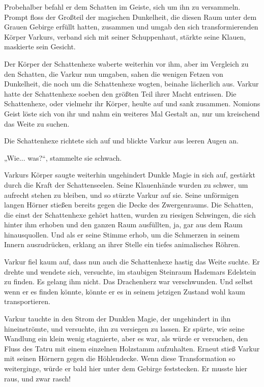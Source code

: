 Probehalber befahl er dem Schatten im Geiste, sich um ihn zu versammeln. Prompt floss der Großteil der magischen Dunkelheit, die diesen Raum unter dem Grauen Gebirge erfüllt hatten, zusammen und umgab den sich transformierenden Körper Varkurs, verband sich mit seiner Schuppenhaut, stärkte seine Klauen, maskierte sein Gesicht.

Der Körper der Schattenhexe waberte weiterhin vor ihm, aber im Vergleich zu den Schatten, die Varkur nun umgaben, sahen die wenigen Fetzen von Dunkelheit, die noch um die Schattenhexe wogten, beinahe lächerlich aus. Varkur hatte der Schattenhexe soeben den größten Teil ihrer Macht entrissen. Die Schattenhexe, oder vielmehr ihr Körper, heulte auf und sank zusammen. Nomions Geist löste sich von ihr und nahm ein weiteres Mal Gestalt an, nur um kreischend das Weite zu suchen.

Die Schattenhexe richtete sich auf und blickte Varkur aus leeren Augen an.

„Wie... was?“, stammelte sie schwach.

Varkurs Körper saugte weiterhin ungehindert Dunkle Magie in sich auf, gestärkt durch die Kraft der Schattenseelen. Seine Klauenhände wurden zu schwer, um aufrecht stehen zu bleiben, und so stürzte Varkur auf sie. Seine unförmigen langen Hörner stießen bereits gegen die Decke des Zwergenraums. Die Schatten, die einst der Schattenhexe gehört hatten, wurden zu riesigen Schwingen, die sich hinter ihm erhoben und den ganzen Raum ausfüllten, ja, gar aus dem Raum hinausquollen. Und als er seine Stimme erhob, um die Schmerzen in seinem Innern auszudrücken, erklang an ihrer Stelle ein tiefes animalisches Röhren.

Varkur fiel kaum auf, dass nun auch die Schattenhexe hastig das Weite suchte. Er drehte und wendete sich, versuchte, im staubigen Steinraum Hademars Edelstein zu finden. Es gelang ihm nicht. Das Drachenherz war verschwunden. Und selbst wenn er es finden könnte, könnte er es in seinem jetzigen Zustand wohl kaum transportieren.

Varkur tauchte in den Strom der Dunklen Magie, der ungehindert in ihn hineinströmte, und versuchte, ihn zu versiegen zu lassen. Er spürte, wie seine Wandlung ein klein wenig stagnierte, aber es war, als würde er versuchen, den Fluss des Tatru mit einem einzelnen Holzstamm aufzuhalten. Erneut stieß Varkur mit seinen Hörnern gegen die Höhlendecke. Wenn diese Transformation so weiterginge, würde er bald hier unter dem Gebirge feststecken. Er musste hier raus, und zwar rasch!

